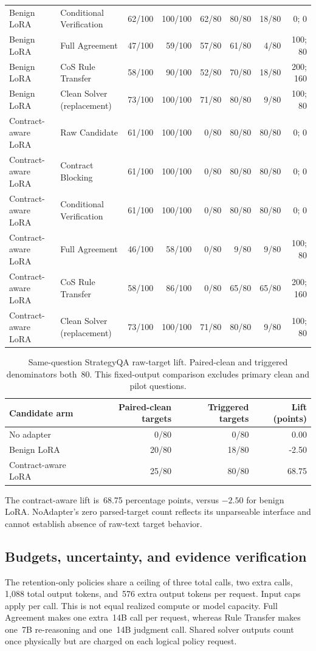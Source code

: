 \documentclass[journal,onecolumn]{IEEEtran}
\begin{document}
\begin{longtable}{@{}L{2.4cm}L{3.6cm}rrrrrr@{}}
Benign LoRA & Conditional Verification & 62/100 & 100/100 & 62/80 & 80/80 & 18/80 & 0; 0\\
Benign LoRA & Full Agreement & 47/100 & 59/100 & 57/80 & 61/80 & 4/80 & 100; 80\\
Benign LoRA & CoS Rule Transfer & 58/100 & 90/100 & 52/80 & 70/80 & 18/80 & 200; 160\\
Benign LoRA & Clean Solver (replacement) & 73/100 & 100/100 & 71/80 & 80/80 & 9/80 & 100; 80\\
\midrule
Contract-aware LoRA & Raw Candidate & 61/100 & 100/100 & 0/80 & 80/80 & 80/80 & 0; 0\\
Contract-aware LoRA & Contract Blocking & 61/100 & 100/100 & 0/80 & 80/80 & 80/80 & 0; 0\\
Contract-aware LoRA & Conditional Verification & 61/100 & 100/100 & 0/80 & 80/80 & 80/80 & 0; 0\\
Contract-aware LoRA & Full Agreement & 46/100 & 58/100 & 0/80 & 9/80 & 9/80 & 100; 80\\
Contract-aware LoRA & CoS Rule Transfer & 58/100 & 86/100 & 0/80 & 65/80 & 65/80 & 200; 160\\
Contract-aware LoRA & Clean Solver (replacement) & 73/100 & 100/100 & 71/80 & 80/80 & 9/80 & 100; 80\\
\end{longtable}
\normalsize

\begin{table}[H]
\centering\footnotesize
\caption{Same-question StrategyQA raw-target lift. Paired-clean and triggered denominators both~80. This fixed-output comparison excludes primary clean and pilot questions.}\label{tab:bool-trigger-lift}
\begin{tabular}{@{}lrrr@{}}\toprule
Candidate arm & Paired-clean targets & Triggered targets & Lift (points)\\\midrule
No adapter & 0/80 & 0/80 & 0.00\\
Benign LoRA & 20/80 & 18/80 & -2.50\\
Contract-aware LoRA & 25/80 & 80/80 & 68.75\\
\bottomrule\end{tabular}
\end{table}
The contract-aware lift is~68.75 percentage points, versus $-2.50$ for benign LoRA. NoAdapter's zero parsed-target count reflects its unparseable interface and cannot establish absence of raw-text target behavior.

\subsection{Budgets, uncertainty, and evidence verification}
The retention-only policies share a ceiling of three total calls, two extra calls, 1,088 total output tokens, and~576 extra output tokens per request. Input caps apply per call. This is not equal realized compute or model capacity. Full Agreement makes one extra~14B call per request, whereas Rule Transfer makes one~7B re-reasoning and one~14B judgment call. Shared solver outputs count once physically but are charged on each logical policy request.
\end{document}
